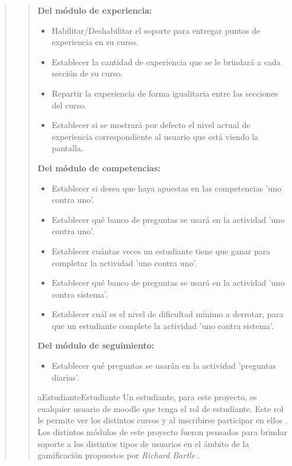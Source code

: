 \begin{quote}
\begin{quote}
    {\bf Del módulo de experiencia:}
        \begin{itemize}
        \item Habilitar/Deshabilitar el soporte para entregar puntos de experiencia
              en su curso.
        \item Establecer la cantidad de experiencia que se le brindará a cada
              sección de su curso.
        \item Repartir la experiencia de forma igualitaria entre las secciones del
              curso.
        \item Establecer si se mostrará por defecto el nivel actual de experiencia
              correspondiente al usuario que está viendo la pantalla.
        \end{itemize}


    {\bf Del módulo de competencias:}
        \begin{itemize}
        \item Establecer si desea que haya apuestas en las competencias 'uno contra uno'.
        \item Establecer qué banco de preguntas se usará en la actividad 'uno contra uno'.
        \item Establecer cuántas veces un estudiante tiene que ganar para completar la actividad 'uno contra uno'.
        \item Establecer qué banco de preguntas se usará en la actividad 'uno contra sistema'.
        \item Establecer cuál es el nivel de dificultad mínimo a derrotar, para que un estudiante complete la actividad 'uno contra sistema'.
        \end{itemize}


    {\bf Del módulo de seguimiento:}
        \begin{itemize}
        \item Establecer qué preguntas se usarán en la actividad 'preguntas diarias'.
        \end{itemize}


    \begin{actor}{aEstudiante}{Estudiante}{%
    Un estudiante, para este proyecto, es cualquier usuario de moodle que tenga el rol de
    estudiante. Este rol le permite ver los distintos cursos y al inscribirse participar
    en ellos \cite{MoodleRolEstudiante}. Los distintos módulos de este proyecto fueron pensados
    para brindar soporte a los distintos tipos de usuarios en el ámbito de la gamificación
    propuestos por {\it Richard Bartle} \cite{BartleUsuarios}.\\}


\end{actor}
\end{quote}
\end{quote}
